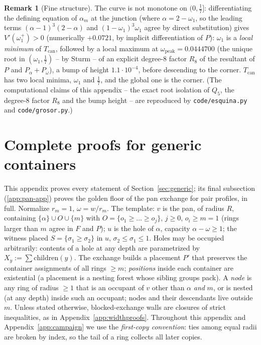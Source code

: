 \documentclass[11pt]{article}
\theoremstyle{definition}
\newtheorem{remark}[theorem]{Remark}
\begin{document}
\begin{remark}[Fine structure]\label{rem:Cbump}
The curve is not monotone on $(0,\tfrac17]$: differentiating the defining
equation of $\alpha_m$ at the junction (where $\alpha=2-\omega_1$, so the
leading terms $(\alpha-1)^3(2-\alpha)$ and $(1-\omega_1)^3\omega_1$ agree
by direct substitution) gives
$V'(\omega_1^+)>0$ (numerically $+0.0721$, by implicit differentiation of
$P$): $\omega_1$ is a
\emph{local minimum} of $T_{\mathrm{can}}$, followed by a local maximum at
$\omega_{\mathrm{peak}}=0.0444700$ (the unique root in
$(\omega_1,\tfrac17)$ -- by Sturm -- of an explicit degree-8 factor $R_8$
of the resultant of $P$ and $P_\alpha+P_\omega$), a bump of height
$1.1\cdot10^{-4}$, before descending to the corner. $T_{\mathrm{can}}$ has
two local minima, $\omega_1$ and $\tfrac17$, and the global one is the
corner. (The computational claims of this appendix -- the exact root
isolation of $Q_5$, the degree-8 factor $R_8$ and the bump height -- are
reproduced by \texttt{code/esquina.py} and \texttt{code/grosor.py}.)
\end{remark}

\section{Complete proofs for generic containers}\label{app:genericproofs}

This appendix proves every statement of Section~\ref{sec:generic}; its
final subsection (\ref{app:pan-app}) proves the golden floor of the pan
exchange for pair profiles, in full.
Normalize $r_m=1$, $\omega=w/r_m$. The template: $v$ is the pan, of radius
$R$, containing $\{\alpha\}\cup O\cup\{m\}$ with $O=\{o_1\ge\dots\ge o_j\}$,
$j\ge0$, $o_i\ge m=1$ (rings larger than $m$ agree in $F$ and $P$); $u$ is
the hole of $\alpha$, capacity $\alpha-\omega\ge1$; the witness placed
$S=\{\sigma_1\ge\sigma_2\}$ in $u$, $\sigma_2\le\sigma_1\le1$. Holes may be
occupied arbitrarily: contents of a hole at any depth are parametrized by
$X_y:=\sum\mathrm{children}(y)$. The exchange builds a placement $P'$ that
preserves the container assignments of all rings $\ge m$; \emph{positions}
inside each container are existential (a placement is a nesting forest
whose sibling groups pack). A \emph{node} is any ring of radius $\ge1$
that is an occupant of $v$ other than $\alpha$ \emph{and} $m$, or is
nested (at any depth) inside such an occupant; nodes and their descendants live outside
$m$. Unless stated otherwise, blocked-exchange walls are closures of
strict inequalities, as in Appendix~\ref{app:widthproofs}. Throughout
this appendix and Appendix~\ref{app:campaign} we use the
\emph{first-copy convention}: ties among equal radii are broken by index,
so the tail of a ring collects all later copies.
\end{document}
